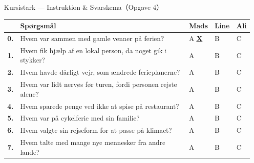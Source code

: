 \begin{emailbox}{Kursistark --- Instruktion \& Svarskema（Opgave 4）}
\vspace{0.3em}
{\small
\renewcommand{\arraystretch}{1.3}
\begin{tabularx}{\linewidth}{@{} >{\bfseries}p{0.6cm} >{\raggedright\arraybackslash}X >{\centering\arraybackslash}p{1.65cm} >{\centering\arraybackslash}p{1.65cm} >{\centering\arraybackslash}p{1.65cm} @{}}
\toprule
 & \textbf{Spørgsmål} & \textbf{Mads} & \textbf{Line} & \textbf{Ali} \\
\midrule
0. & Hvem var sammen med gamle venner på ferien? & A \underline{\textbf{X}} & B \underline{\hspace{0.45cm}} & C \underline{\hspace{0.45cm}} \\
\midrule
1. & Hvem fik hjælp af en lokal person, da noget gik i stykker? & A \underline{\hspace{0.45cm}} & B \underline{\hspace{0.45cm}} & C \underline{\hspace{0.45cm}} \\
2. & Hvem havde dårligt vejr, som ændrede ferieplanerne? & A \underline{\hspace{0.45cm}} & B \underline{\hspace{0.45cm}} & C \underline{\hspace{0.45cm}} \\
3. & Hvem var lidt nervøs før turen, fordi personen rejste alene? & A \underline{\hspace{0.45cm}} & B \underline{\hspace{0.45cm}} & C \underline{\hspace{0.45cm}} \\
4. & Hvem sparede penge ved ikke at spise på restaurant? & A \underline{\hspace{0.45cm}} & B \underline{\hspace{0.45cm}} & C \underline{\hspace{0.45cm}} \\
5. & Hvem var på cykelferie med sin familie? & A \underline{\hspace{0.45cm}} & B \underline{\hspace{0.45cm}} & C \underline{\hspace{0.45cm}} \\
6. & Hvem valgte sin rejseform for at passe på klimaet? & A \underline{\hspace{0.45cm}} & B \underline{\hspace{0.45cm}} & C \underline{\hspace{0.45cm}} \\
7. & Hvem talte med mange nye mennesker fra andre lande? & A \underline{\hspace{0.45cm}} & B \underline{\hspace{0.45cm}} & C \underline{\hspace{0.45cm}} \\
\bottomrule
\end{tabularx}
}
\end{emailbox}

